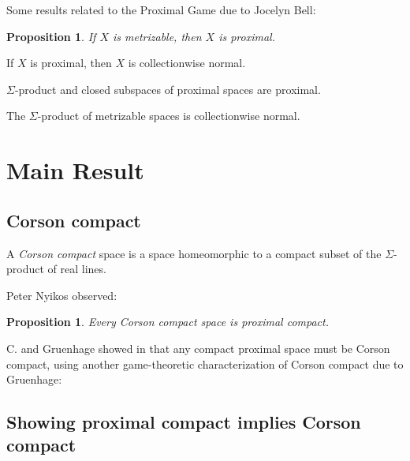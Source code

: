 \documentclass{beamer}
\newtheorem{proposition}[theorem]{Proposition}
\theoremstyle{definition}
\newcommand{\<}{\langle}
\renewcommand{\>}{\rangle}
\newcommand{\term}{\textit}
\begin{document}
\begin{frame}
  Some results related to the Proximal Game due to Jocelyn Bell:

  \begin{proposition}
    If $X$ is metrizable, then $X$ is proximal.
  \end{proposition}

  \begin{theorem}
    If $X$ is proximal, then $X$ is collectionwise normal.
  \end{theorem}

  \begin{theorem}
    $\Sigma$-product and closed subspaces of proximal spaces are proximal.
  \end{theorem}

  \pause

  \begin{corollary}
    The $\Sigma$-product of metrizable spaces is collectionwise normal.
    \cite{MR0461410} \cite{MR716576}
  \end{corollary}
\end{frame}

\section{Main Result}

\subsection{Corson compact}

\begin{frame}
  A \term{Corson compact} space is a space homeomorphic to a compact
  subset of the $\Sigma$-product of real lines.

  \vpause

  Peter Nyikos observed:

  \begin{proposition}
    Every Corson compact space is proximal compact. \cite{nyikosProximalPreprint}
  \end{proposition}

  \pause

  C. and Gruenhage showed in \cite{MR3227201} that any compact proximal
  space must be Corson compact, using another game-theoretic characterization
  of Corson compact due to Gruenhage:
\end{frame}

\subsection{Showing proximal compact implies Corson compact}
\end{document}
